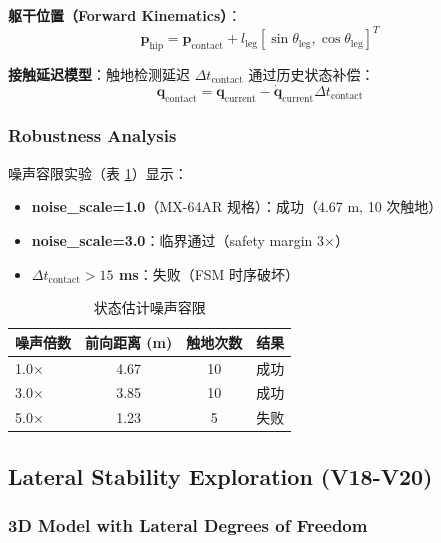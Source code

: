 \textbf{躯干位置（Forward Kinematics）}：
\begin{equation}
    \mathbf{p}_{\text{hip}} = \mathbf{p}_{\text{contact}} + l_{\text{leg}} [\sin\theta_{\text{leg}}, \cos\theta_{\text{leg}}]^T
\end{equation}

\textbf{接触延迟模型}：触地检测延迟 $\Delta t_{\text{contact}}$ 通过历史状态补偿：
\begin{equation}
    \mathbf{q}_{\text{contact}} = \mathbf{q}_{\text{current}} - \dot{\mathbf{q}}_{\text{current}} \Delta t_{\text{contact}}
\end{equation}

\subsubsection{Robustness Analysis}

噪声容限实验（表 \ref{tab:state_est}）显示：
\begin{itemize}
    \item \textbf{noise\_scale=1.0}（MX-64AR 规格）：成功（4.67 m, 10 次触地）
    \item \textbf{noise\_scale=3.0}：临界通过（safety margin 3×）
    \item \textbf{$\Delta t_{\text{contact}} > 15$ ms}：失败（FSM 时序破坏）
\end{itemize}

\begin{table}[t]
\centering
\caption{状态估计噪声容限}
\label{tab:state_est}
\begin{tabular}{@{}lccc@{}}
\toprule
噪声倍数 & 前向距离 (m) & 触地次数 & 结果 \\
\midrule
1.0× & 4.67 & 10 & 成功 \\
3.0× & 3.85 & 10 & 成功 \\
5.0× & 1.23 & 5 & 失败 \\
\bottomrule
\end{tabular}
\end{table}

\subsection{Lateral Stability Exploration (V18-V20)}

\subsubsection{3D Model with Lateral Degrees of Freedom}

